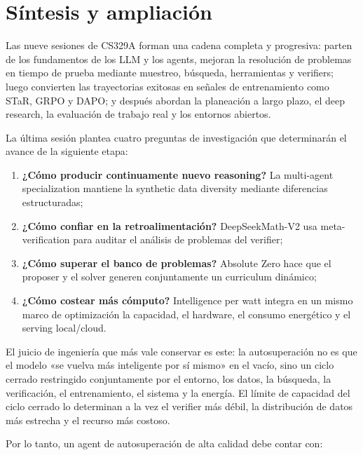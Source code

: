 \documentclass[a4paper]{article}
\begin{document}
\section{Síntesis y ampliación}

Las nueve sesiones de CS329A forman una cadena completa y progresiva: parten de los fundamentos de los LLM y los agents, mejoran la resolución de problemas en tiempo de prueba mediante muestreo, búsqueda, herramientas y verifiers; luego convierten las trayectorias exitosas en señales de entrenamiento como STaR, GRPO y DAPO; y después abordan la planeación a largo plazo, el deep research, la evaluación de trabajo real y los entornos abiertos.

La última sesión plantea cuatro preguntas de investigación que determinarán el avance de la siguiente etapa:

\begin{enumerate}
    \item \textbf{¿Cómo producir continuamente nuevo reasoning?} La multi-agent specialization mantiene la synthetic data diversity mediante diferencias estructuradas;
    \item \textbf{¿Cómo confiar en la retroalimentación?} DeepSeekMath-V2 usa meta-verification para auditar el análisis de problemas del verifier;
    \item \textbf{¿Cómo superar el banco de problemas?} Absolute Zero hace que el proposer y el solver generen conjuntamente un curriculum dinámico;
    \item \textbf{¿Cómo costear más cómputo?} Intelligence per watt integra en un mismo marco de optimización la capacidad, el hardware, el consumo energético y el serving local/cloud.
\end{enumerate}

El juicio de ingeniería que más vale conservar es este: la autosuperación no es que el modelo «se vuelva más inteligente por sí mismo» en el vacío, sino un ciclo cerrado restringido conjuntamente por el entorno, los datos, la búsqueda, la verificación, el entrenamiento, el sistema y la energía. El límite de capacidad del ciclo cerrado lo determinan a la vez el verifier más débil, la distribución de datos más estrecha y el recurso más costoso.

Por lo tanto, un agent de autosuperación de alta calidad debe contar con:
\end{document}
